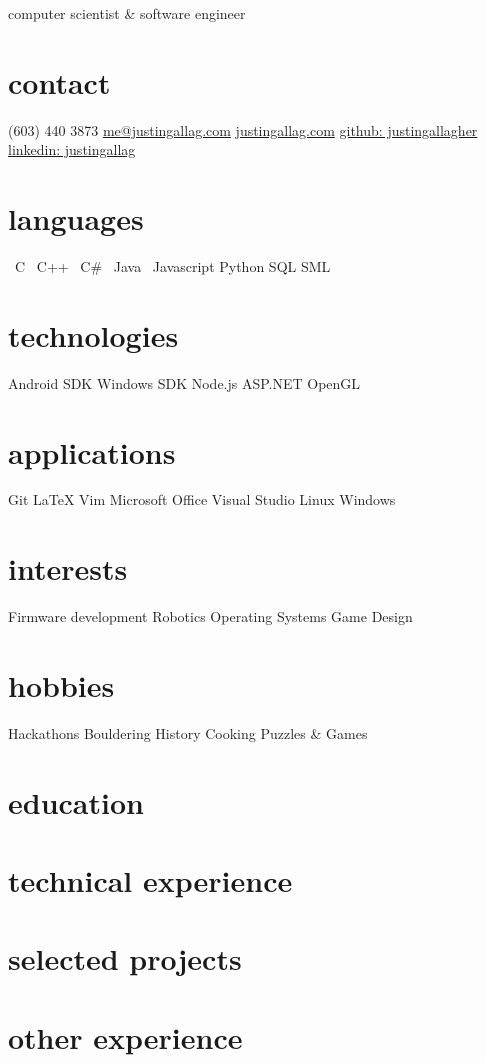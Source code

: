 \documentclass[]{friggeri-cv}
\newcommand{\starr}{\raisebox{0.2ex}{$\star $}}
\begin{document}
    {computer scientist \& software engineer}

    \begin{aside}
        \section{contact}
            (603) 440 3873
            \href{mailto:me@justingallag.com}{me@justingallag.com}
            \href{http://justingallag.com}{justingallag.com}
            \href{https://github.com/justingallagher}{github: justingallagher}
            \href{https://www.linkedin.com/in/justingallag}{linkedin: justingallag}
        \section{languages}
            \starr \ C
            \starr \ C++
            \starr \ C\#
            \starr \ Java
            \starr \ Javascript
            Python
            SQL
            SML
        \section{technologies}
            Android SDK
            Windows SDK
            Node.js
            ASP.NET
            OpenGL
        \section{applications}
            Git
            LaTeX
            Vim
            Microsoft Office
            Visual Studio
            Linux
            Windows
        \section{interests}
            Firmware development
            Robotics
            Operating Systems
            Game Design
        \section{hobbies}
            Hackathons
            Bouldering
            History
            Cooking
            Puzzles \& Games
    \end{aside}

    \section{education}
    \section{technical experience}
    \section{selected projects}
    \section{other experience}
\end{document}
